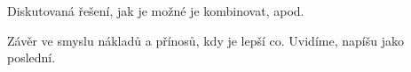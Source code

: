 \documentclass[12pt]{article}
\begin{document}
Diskutovaná řešení, jak je možné je kombinovat, apod.



Závěr ve smyslu nákladů a přínosů, kdy je lepší co. Uvidíme, napíšu jako poslední.






\end{document}
